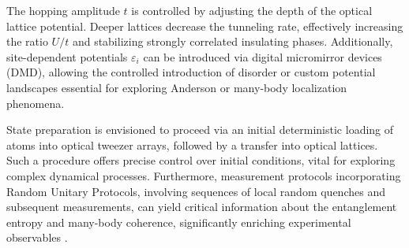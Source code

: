 The hopping amplitude $t$ is controlled by adjusting the depth of the optical lattice potential. Deeper lattices decrease the tunneling rate, effectively increasing the ratio $U/t$ and stabilizing strongly correlated insulating phases. Additionally, site-dependent potentials $\varepsilon_i$ can be introduced via digital micromirror devices (DMD), allowing the controlled introduction of disorder or custom potential landscapes essential for exploring Anderson or many-body localization phenomena.

State preparation is envisioned to proceed via an initial deterministic loading of atoms into optical tweezer arrays, followed by a transfer into optical lattices. Such a procedure offers precise control over initial conditions, vital for exploring complex dynamical processes. Furthermore, measurement protocols incorporating Random Unitary Protocols, involving sequences of local random quenches and subsequent measurements, can yield critical information about the entanglement entropy and many-body coherence, significantly enriching experimental observables \cite{culemann_construction_2024, huang_construction_2024}.


